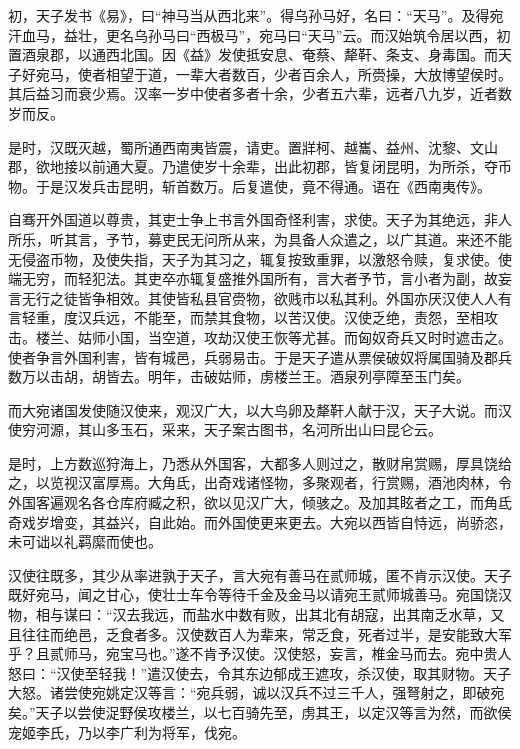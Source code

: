 \documentclass[12pt,UTF8]{ctexbook}
\begin{document}
初，天子发书《易》，曰“神马当从西北来”。得乌孙马好，名曰：“天马”。及得宛汗血马，益壮，更名乌孙马曰“西极马”，宛马曰“天马”云。而汉始筑令居以西，初置酒泉郡，以通西北国。因《益》发使抵安息、奄蔡、犛靬、条支、身毒国。而天子好宛马，使者相望于道，一辈大者数百，少者百余人，所赍操，大放博望侯时。其后益习而衰少焉。汉率一岁中使者多者十余，少者五六辈，远者八九岁，近者数岁而反。



是时，汉既灭越，蜀所通西南夷皆震，请吏。置牂柯、越巂、益州、沈黎、文山郡，欲地接以前通大夏。乃遣使岁十余辈，出此初郡，皆复闭昆明，为所杀，夺币物。于是汉发兵击昆明，斩首数万。后复遣使，竟不得通。语在《西南夷传》。



自骞开外国道以尊贵，其吏士争上书言外国奇怪利害，求使。天子为其绝远，非人所乐，听其言，予节，募吏民无问所从来，为具备人众遣之，以广其道。来还不能无侵盗币物，及使失指，天子为其习之，辄复按致重罪，以激怒令赎，复求使。使端无穷，而轻犯法。其吏卒亦辄复盛推外国所有，言大者予节，言小者为副，故妄言无行之徒皆争相效。其使皆私县官赍物，欲贱市以私其利。外国亦厌汉使人人有言轻重，度汉兵远，不能至，而禁其食物，以苦汉使。汉使乏绝，责怨，至相攻击。楼兰、姑师小国，当空道，攻劫汉使王恢等尤甚。而匈奴奇兵又时时遮击之。使者争言外国利害，皆有城邑，兵弱易击。于是天子遣从票侯破奴将属国骑及郡兵数万以击胡，胡皆去。明年，击破姑师，虏楼兰王。酒泉列亭障至玉门矣。



而大宛诸国发使随汉使来，观汉广大，以大鸟卵及犛靬人献于汉，天子大说。而汉使穷河源，其山多玉石，采来，天子案古图书，名河所出山曰昆仑云。



是时，上方数巡狩海上，乃悉从外国客，大都多人则过之，散财帛赏赐，厚具饶给之，以览视汉富厚焉。大角氐，出奇戏诸怪物，多聚观者，行赏赐，酒池肉林，令外国客遍观名各仓库府臧之积，欲以见汉广大，倾骇之。及加其眩者之工，而角氐奇戏岁增变，其益兴，自此始。而外国使更来更去。大宛以西皆自恃远，尚骄恣，未可诎以礼羁縻而使也。



汉使往既多，其少从率进孰于天子，言大宛有善马在贰师城，匿不肯示汉使。天子既好宛马，闻之甘心，使壮士车令等待千金及金马以请宛王贰师城善马。宛国饶汉物，相与谋曰：“汉去我远，而盐水中数有败，出其北有胡寇，出其南乏水草，又且往往而绝邑，乏食者多。汉使数百人为辈来，常乏食，死者过半，是安能致大军乎？且贰师马，宛宝马也。”遂不肯予汉使。汉使怒，妄言，椎金马而去。宛中贵人怒曰：“汉使至轻我！”遣汉使去，令其东边郁成王遮攻，杀汉使，取其财物。天子大怒。诸尝使宛姚定汉等言：“宛兵弱，诚以汉兵不过三千人，强弩射之，即破宛矣。”天子以尝使浞野侯攻楼兰，以七百骑先至，虏其王，以定汉等言为然，而欲侯宠姬李氏，乃以李广利为将军，伐宛。
\end{document}
